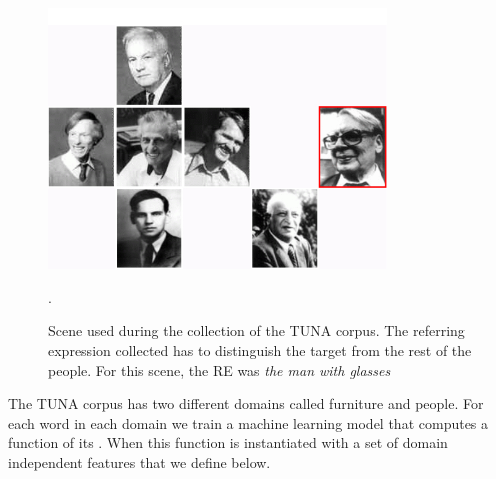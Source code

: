 \begin{figure}[ht]
\centering
\includegraphics[width=0.8\textwidth]{images/tuna-people.jpg}

\caption{Scene used during the collection of the TUNA corpus. The referring expression collected has to distinguish the target from the rest of the people. For this scene, the RE was \emph{the man with glasses}}. 
\label{Tuna-people-scene}
\centering

\end{figure}

The TUNA corpus has two different domains called furniture and people. For each word in each domain we train a machine learning model that computes a function of its \puse. When this function is instantiated with a set of domain independent features that we define below. 



